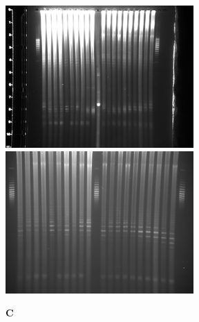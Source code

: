 \documentclass[10pt,letterpaper]{article}
\begin{document}
\begin{figure}[ht!]
  \begin{minipage}{.49\textwidth}
    \includegraphics[width=\textwidth]{figures/diurnal/Y_CQ01_high_exposure.png}
  \end{minipage}
  \begin{minipage}{.49\textwidth}
    \includegraphics[width=\textwidth]{figures/diurnal/20130618_1511.png}
  \end{minipage}
  
  \vspace{-.5cm}
  \textbf{C}
  \vspace{.25cm}
  

\end{figure}
\end{document}
